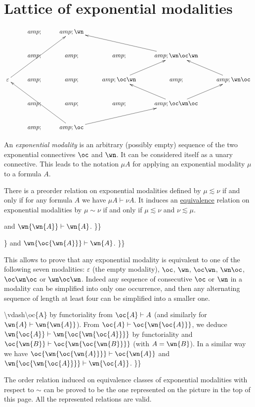 \section{Lattice of exponential modalities}\label{lattice-of-exponential-modalities}

\(\xymatrix{
 &amp; &amp; {\wn} \\
 &amp; &amp; &amp; &amp; {\wn\oc\wn}\ar[ull] \\
\varepsilon\ar[uurr] &amp; &amp; &amp; {\oc\wn} \ar[ur] &amp; &amp; {\wn\oc} \ar[ul] \\
 &amp; &amp; &amp; &amp; {\oc\wn\oc} \ar[ul]\ar[ur] \\
 &amp; &amp; {\oc} \ar[uull]\ar[urr]
}\)

An \emph{exponential modality} is an arbitrary (possibly empty) sequence
of the two exponential connectives \(\oc\) and \(\wn\). It can be
considered itself as a unary connective. This leads to the notation
\(\mu A\) for applying an exponential modality \(\mu\) to a formula
\(A\).

There is a preorder relation on exponential modalities defined by
\(\mu\lesssim\nu\) if and only if for any formula \(A\) we have
\(\mu A\vdash \nu A\). It induces an
\href{List_of_equivalences}{equivalence} relation on exponential
modalities by \(\mu \sim \nu\) if and only if \(\mu\lesssim\nu\) and
\(\nu\lesssim\mu\).

 and \(\wn{\wn{A}}\vdash\wn{A}\). \}\}

\} and \(\wn{\oc{\wn{A}}}\vdash\wn{A}\). \}\}

This allows to prove that any exponential modality is equivalent to one
of the following seven modalities: \(\varepsilon\) (the empty modality),
\(\oc\), \(\wn\), \(\oc\wn\), \(\wn\oc\), \(\oc\wn\oc\) or
\(\wn\oc\wn\). Indeed any sequence of consecutive \(\oc\) or \(\wn\) in
a modality can be simplified into only one occurrence, and then any
alternating sequence of length at least four can be simplified into a
smaller one.

\textbackslash{}vdash\textbackslash{}oc\{A\} by functoriality from
\(\oc{A}\vdash A\) (and similarly for \(\wn{A}\vdash\wn{\wn{A}}\)). From
\(\oc{A}\vdash \oc{\wn{\oc{A}}}\), we deduce
\(\wn{\oc{A}}\vdash \wn{\oc{\wn{\oc{A}}}}\) by functoriality and
\(\oc{\wn{B}}\vdash \oc{\wn{\oc{\wn{B}}}}\) (with \(A=\wn{B}\)). In a
similar way we have \(\oc{\wn{\oc{\wn{A}}}}\vdash \oc{\wn{A}}\) and
\(\wn{\oc{\wn{\oc{A}}}}\vdash \wn{\oc{A}}\). \}\}

The order relation induced on equivalence classes of exponential
modalities with respect to \(\sim\) can be proved to be the one
represented on the picture in the top of this page. All the represented
relations are valid.


